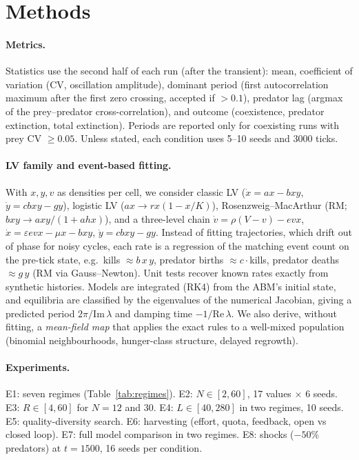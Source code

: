 \section{Methods}
\paragraph{Metrics.} Statistics use the second half of each run (after the transient): mean, coefficient
of variation (CV, oscillation amplitude), dominant period (first autocorrelation maximum after the first
zero crossing, accepted if $>0.1$), predator lag (argmax of the prey--predator cross-correlation), and
outcome (coexistence, predator extinction, total extinction). Periods are reported only for coexisting runs
with prey CV $\ge 0.05$. Unless stated, each condition uses 5--10 seeds and 3000 ticks.

\paragraph{LV family and event-based fitting.} With $x,y,v$ as densities per cell, we consider
classic LV ($\dot x=ax-bxy$, $\dot y=cbxy-gy$), logistic LV ($ax\to rx(1-x/K)$), Rosenzweig--MacArthur
(RM; $bxy\to axy/(1+ahx)$), and a three-level chain
$\dot v=\rho(V-v)-evx$, $\dot x=\varepsilon evx-\mu x-bxy$, $\dot y=cbxy-gy$.
Instead of fitting trajectories, which drift out of phase for noisy cycles, each rate is a regression of the
matching event count on the pre-tick state, e.g.\ kills $\approx b\,x\,y$, predator births $\approx c\cdot$kills,
predator deaths $\approx g\,y$ (RM via Gauss--Newton). Unit tests recover known rates exactly from synthetic
histories. Models are integrated (RK4) from the ABM's initial state, and equilibria are classified by the
eigenvalues of the numerical Jacobian, giving a predicted period $2\pi/\mathrm{Im}\,\lambda$ and damping time
$-1/\mathrm{Re}\,\lambda$. We also derive, without fitting, a \emph{mean-field map} that applies the exact
rules to a well-mixed population (binomial neighbourhoods, hunger-class structure, delayed regrowth).

\paragraph{Experiments.} E1: seven regimes (Table~\ref{tab:regimes}). E2: $N\in[2,60]$, 17 values $\times$ 6
seeds. E3: $R\in[4,60]$ for $N=12$ and $30$. E4: $L\in[40,280]$ in two regimes, 10 seeds. E5:
quality-diversity search. E6: harvesting (effort, quota, feedback, open vs closed loop). E7: full model
comparison in two regimes. E8: shocks ($-50\%$ predators) at $t=1500$, 16 seeds per condition.


